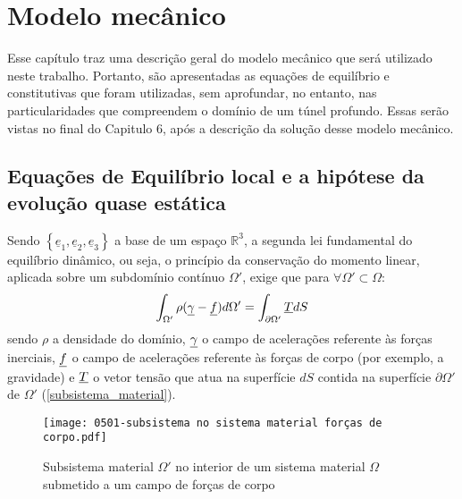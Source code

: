 \chapter{Modelo mecânico}

Esse capítulo traz uma descrição geral do modelo mecânico que será utilizado neste trabalho. Portanto, são apresentadas as equações de equilíbrio e constitutivas que foram utilizadas, sem aprofundar, no entanto, nas particularidades que compreendem o domínio de um túnel profundo. Essas serão vistas no final do Capitulo 6, após a descrição da solução desse modelo mecânico. 

\section{Equações de Equilíbrio local e a hipótese da evolução quase estática}

Sendo $\left\{\underline{e}_1,\underline{e}_2,\underline{e}_3\right\}$ a base de um espaço $\mathbb{R}^3$, a segunda lei fundamental do equilíbrio dinâmico, ou seja, o princípio da conservação do momento linear, aplicada sobre um subdomínio contínuo $\Omega'$, exige que para $\forall \Omega' \subset \Omega$:
\begin{equation}
	\label{eq:conservacao_momento_linear}
\int_{\Omega'}\rho(\underline \gamma-\underline f)d\Omega' = \int_{\partial\Omega'}\underline T dS
\end{equation}
sendo $\rho$ a densidade do domínio, $\underline \gamma$ o campo de acelerações referente às forças inerciais, $\underline f$ o campo de acelerações referente às forças de corpo (por exemplo, a gravidade) e $\underline T$ o vetor tensão que atua na superfície $dS$ contida na superfície $\partial\Omega'$ de $\Omega'$ (\autoref{subsistema_material}).

\begin{figure}[H]
	\begin{center}
		\texttt{[image: 0501-subsistema no sistema material forças de corpo.pdf]}
	\end{center}
	\caption{\label{subsistema_material}Subsistema material $\Omega'$ no interior de um sistema material $\Omega$ submetido a um campo de forças de corpo}
\end{figure}

